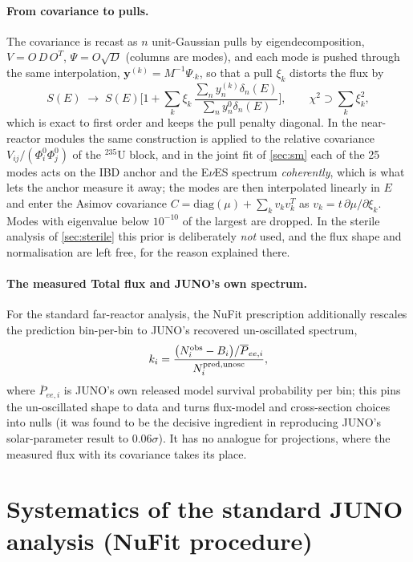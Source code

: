 \documentclass[aps,prd,superscriptaddress,nofootinbib,longbibliography,notitlepage,11pt]{revtex4-2}
\newcommand{\eves}{E$\nu$ES}
\begin{document}
\paragraph{From covariance to pulls.}
The covariance is recast as $n$ unit-Gaussian pulls by eigendecomposition,
$V=O\,D\,O^T$, $\Psi=O\sqrt D$ (columns are modes), and each mode is pushed through the
same interpolation, $\bm y^{(k)}=M^{-1}\Psi_{\cdot k}$, so that a pull $\xi_k$ distorts
the flux by
\begin{equation}
S(E)\;\to\;S(E)\Big[1+\sum_k\xi_k\,\frac{\sum_ny^{(k)}_n\delta_n(E)}{\sum_ny^0_n\delta_n(E)}\Big],
\qquad \chi^2\supset\sum_k\xi_k^2,
\label{eq:appA_pulls}
\end{equation}
which is exact to first order and keeps the pull penalty diagonal.  In the near-reactor
modules the same construction is applied to the relative covariance
$V_{ij}/(\Phi^0_i\Phi^0_j)$ of the $^{235}$U block, and in the joint fit of \cref{sec:sm}
each of the 25 modes acts on the IBD anchor and the \eves{} spectrum \emph{coherently},
which is what lets the anchor measure it away; the modes are then interpolated linearly in
$E$ and enter the Asimov covariance $C=\mathrm{diag}(\mu)+\sum_kv_kv_k^T$ as $v_k=t\,\partial\mu/\partial\xi_k$.
Modes with eigenvalue below $10^{-10}$ of the largest are dropped.  In the sterile analysis
of \cref{sec:sterile} this prior is deliberately \emph{not} used, and the flux shape and
normalisation are left free, for the reason explained there.

\paragraph{The measured Total flux and JUNO's own spectrum.}
For the standard far-reactor analysis, the NuFit prescription additionally rescales the
prediction bin-per-bin to JUNO's recovered un-oscillated spectrum,
\begin{equation}
k_i=\frac{\big(N^{\rm obs}_i-B_i\big)/\overline{P}_{ee,i}}{N^{\rm pred,unosc}_i},
\label{eq:binscale}
\end{equation}
where $\overline{P}_{ee,i}$ is JUNO's own released model survival probability per bin;
this pins the un-oscillated shape to data and turns flux-model and cross-section choices
into nulls (it was found to be the decisive ingredient in reproducing JUNO's solar-parameter
result to $0.06\sigma$).  It has no analogue for projections, where the measured flux with
its covariance takes its place.

\section{Systematics of the standard JUNO analysis (NuFit procedure)}
\label{app:nufit}
\end{document}

